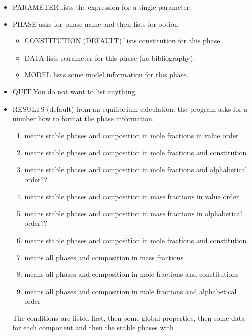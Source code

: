 \documentclass[12pt]{article}
\begin{document}
\begin{itemize}
\begin{itemize}
  \item PARAMETER lists the expression for a single parameter.
  \item PHASE asks for phase name and then lists for option
    \begin{itemize}
    \item CONSTITUTION (DEFAULT) lists constitution for this phase.
    \item DATA lists parameter for this phase (no bibliography).
    \item MODEL lists some model information for this phase.
    \end{itemize}
  \item QUIT You do not want to list anything.
  \item RESULTS (default) from an equilibrium calculation.  the program
    asks for a number how to format the phase information.  
    \begin{enumerate}
    \item means stable phases and composition in mole fractions in value order
    \item means stable phases and composition in mole fractions and constitution
    \item means stable phases and composition in mole fractions and
      alphabetical order??
    \item means stable phases and composition in mass fractions in value order
    \item means stable phases and composition in mass fractions in
      alphabetical order??
    \item means stable phases and composition in mole fractions and constitution
    \item means all phases and composition in mass fractions
    \item means all phases and composition in mole fractions and constitutions
    \item means all phases and composition in mole fractions and
      alphabetical order
    \end{enumerate}
    The conditions are listed first, then some global properties, then
    some data for each component and then the stable phases with

\end{itemize}
\end{itemize}
\end{document}
